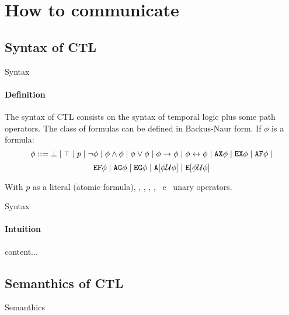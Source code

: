\section{How to communicate}
\subsection{Syntax of CTL}
\begin{frame}{Syntax}
	\framesubtitle{Definition}
	The syntax of CTL consists on the syntax of temporal logic plus some path operators. The class of formulas can be defined in Backus-Naur form. If $\phi$ is a formula: \pause
	$$\phi ::= \bot \; | \; \top \; | \; p \; | \; \neg \phi \; | \; \phi \land \phi \; | \; \phi \lor \phi \; | \; \phi \to \phi \; | \; \phi \leftrightarrow \phi \; | \; \texttt{AX} \phi \; | \; \texttt{EX} \phi \; | \; \texttt{AF} \phi \; |$$
	$$\texttt{EF} \phi \; | \; \texttt{AG} \phi \; | \; \texttt{EG} \phi \; | \; \texttt{A}[\phi \mathcal{U} \phi] \; | \; \texttt{E}[\phi \mathcal{U} \phi]$$\pause
	
	With $p$ as a literal (atomic formula), \AX, \EX, \AF, \EF, \AG \, e \EG \, unary operators.
	
\end{frame}

\begin{frame}{Syntax}
	\framesubtitle{Intuition}
	content...
\end{frame}
\subsection{Semanthics of CTL}
\begin{frame}{Semanthics}
	
\end{frame}